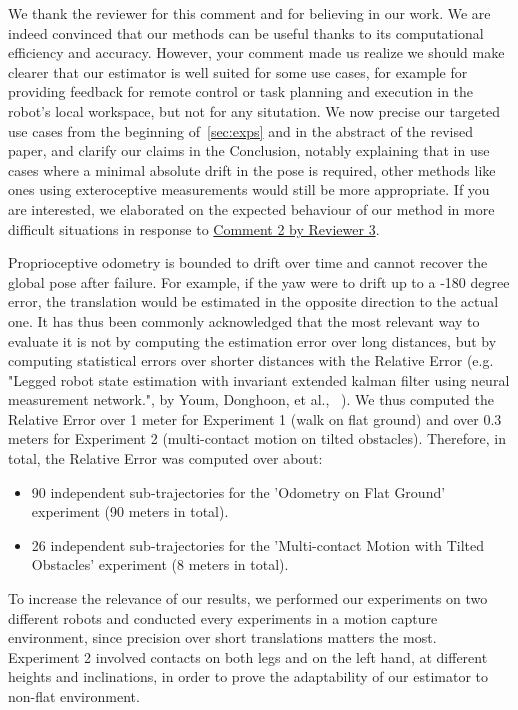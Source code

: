 We thank the reviewer for this comment and for believing in our work. We are indeed convinced that our methods can be useful thanks to its computational efficiency and accuracy.
However, your comment made us realize we should make clearer that our estimator is well suited for some use cases, for example for providing feedback for remote control or task planning and execution in the robot's local workspace, but not for any situtation. We now precise our targeted use cases from the beginning of~\ref{sec:exps} and in the abstract of the revised paper, and clarify our claims in the Conclusion, notably explaining that in use cases where a minimal absolute drift in the pose is required, other methods like ones using exteroceptive measurements would still be more appropriate. If you are interested, we elaborated on the expected behaviour of our method in more difficult situations in response to \hyperlink{Comment 2 Rev 3}{Comment 2 by Reviewer 3}.


Proprioceptive odometry is bounded to drift over time and cannot recover the global pose after failure. For example, if the yaw were to drift up to a -180 degree error, the translation would be estimated in the opposite direction to the actual one. It has thus been commonly acknowledged that the most relevant way to evaluate it is not by computing the estimation error over long distances, but by computing statistical errors over shorter distances with the Relative Error (e.g. "Legged robot state estimation with invariant extended kalman filter using neural measurement network.", by Youm, Donghoon, et al., ~\cite{yoon2023InvariantSmootherDynamicContactEventInformation}). We thus computed the Relative Error over 1 meter for Experiment 1 (walk on flat ground) and over 0.3 meters for Experiment 2 (multi-contact motion on tilted obstacles). Therefore, in total, the Relative Error was computed over about:
\begin{itemize}
    \item 90 independent sub-trajectories for the 'Odometry on Flat Ground' experiment (90 meters in total).
    \item 26 independent sub-trajectories for the 'Multi-contact Motion with Tilted Obstacles' experiment (8 meters in total).
\end{itemize}
To increase the relevance of our results, we performed our experiments on two different robots and conducted every experiments in a motion capture environment, since precision over short translations matters the most. Experiment 2 involved contacts on both legs and on the left hand, at different heights and inclinations, in order to prove the adaptability of our estimator to non-flat environment.



